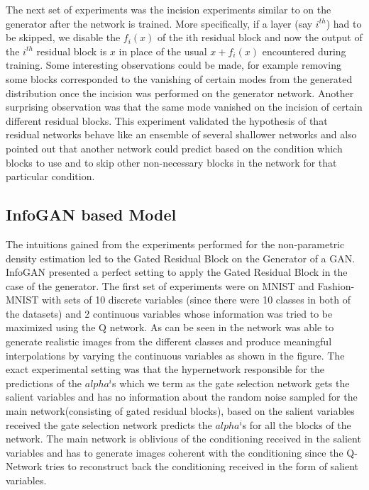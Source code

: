 The next set of experiments was the incision experiments similar to \cite{veit2016residual} on the generator after the network is trained. More specifically, if a layer (say $i^{th}$) had to be skipped, we disable the $f_i(x)$ of the ith residual block and now the output of the $i^{th}$ residual block is $x$ in place of the usual $x+f_i(x)$ encountered during training. Some interesting observations could be made, for example removing some blocks corresponded to the vanishing of certain modes from the generated distribution once the incision was performed on the generator network. Another surprising observation was that the same mode vanished on the incision of certain different residual blocks. This experiment validated the hypothesis of \cite{veit2016residual} that residual networks behave like an ensemble of several shallower networks and also pointed out that another network could predict based on the condition which blocks to use and to skip other non-necessary blocks in the network for that particular condition.




\subsection{InfoGAN based Model}
The intuitions gained from the experiments performed for the non-parametric density estimation led to the Gated Residual Block on the Generator of a GAN. InfoGAN \cite{chen2016infogan} presented a perfect setting to apply the Gated Residual Block in the case of the generator. The first set of experiments were on MNIST and Fashion-MNIST with sets of 10 discrete variables (since there were 10 classes in both of the datasets) and 2 continuous variables whose information was tried to be maximized using the Q network. As can be seen in  the network was able to generate realistic images from the different classes and produce meaningful interpolations by varying the continuous variables as shown in the figure. The exact experimental setting was that the hypernetwork responsible for the predictions of the $alpha^i$s which we term as the gate selection network gets the salient variables and has no information about the random noise sampled for the main network(consisting of gated residual blocks), based on the salient variables received the gate selection network predicts the  $alpha^i$s for all the blocks of the network. The main network is oblivious of the conditioning received in the salient variables and has to generate images coherent with the conditioning since the Q-Network tries to reconstruct back the conditioning received in the form of salient variables. 

